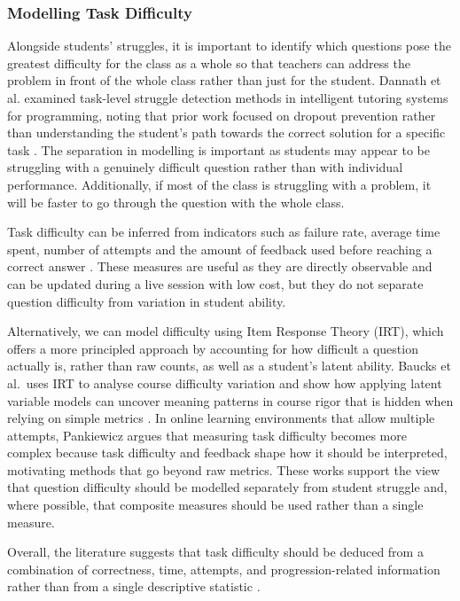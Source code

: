 \subsubsection{Modelling Task Difficulty}


Alongside students' struggles, it is important to identify which questions pose the greatest difficulty for the class as a whole so that teachers can address the problem in front of the whole class rather than just for the student.
Dannath et al. examined task-level struggle detection methods in intelligent tutoring systems for programming, noting that prior work focused on dropout prevention rather than understanding the student's path towards the correct solution for a specific task \cite{dannath_evaluating}.
The separation in modelling is important as students may appear to be struggling with a genuinely difficult question rather than with individual performance. 
Additionally, if most of the class is struggling with a problem, it will be faster to go through the question with the whole class.

Task difficulty can be inferred from indicators such as failure rate, average time spent, number of attempts and the amount of feedback used before reaching a correct answer \cite{dannath_evaluating,piech_modeling}.
These measures are useful as they are directly observable and can be updated during a live session with low cost, but they do not separate question difficulty from variation in student ability.

Alternatively, we can model difficulty using Item Response Theory (IRT), which offers a more principled approach by accounting for how difficult a question actually is, rather than raw counts, as well as a student's latent ability. 
Baucks et al.\ uses IRT to analyse course difficulty variation and show how applying latent variable models can uncover meaning patterns in course rigor that is hidden when relying on simple metrics \cite{frederikbaucks_2024_gaining}. 
In online learning environments that allow multiple attempts, Pankiewicz argues that measuring task difficulty becomes more complex because task difficulty and feedback shape how it should be interpreted, motivating methods that go beyond raw metrics. \cite{pankiewicz_measuring}  
These works support the view that question difficulty should be modelled separately from student struggle and, where possible, that composite measures should be used rather than a single measure.

Overall, the literature suggests that task difficulty should be deduced from a combination of correctness, time, attempts, and progression-related information rather than from a single descriptive statistic \cite{dannath_evaluating,piech_modeling}.

